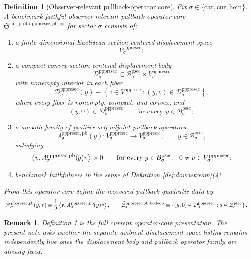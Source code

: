 \documentclass[11pt]{article}
\newcommand{\Car}{\mathrm{car}}
\newcommand{\Cur}{\mathrm{cur}}
\newcommand{\Hom}{\mathrm{hom}}
\newcommand{\ProtoSectionBody}[1]{\mathcal B_{#1}^{\mathrm{psec}}}
\newcommand{\ProtoSectionShell}[1]{\mathcal Z_{#1}^{\mathrm{psec}}}
\newcommand{\PrePreProtoSectionVertical}[1]{V_{#1}^{\mathrm{pppresec}}}
\newcommand{\PrePreProtoSectionResidualBody}[1]{\mathcal D_{#1}^{\mathrm{pppresec}}}
\newcommand{\PrePreProtoSectionPullbackOperator}[1]{A_{#1}^{\mathrm{pppresec,pb}}}
\newcommand{\PrePreProtoSectionPullbackFunctional}[1]{\mathscr P_{#1}^{\mathrm{pppresec,pb}}}
\newcommand{\PullbackOperatorCore}{\mathfrak S^{\mathrm{sub,proto,pppresec,pb,op}}}
\newcommand{\RecoveredPullbackShell}[1]{\widehat{\mathcal Z}_{#1}^{\mathrm{pppresec,pb,bodyop}}}
\newtheorem{definition}{Definition}
\newtheorem{remark}{Remark}
\begin{document}
\begin{definition}[Observer-relevant pullback-operator core]
\label{def:operatorcore}
Fix \(\sigma\in\{\Car,\Cur,\Hom\}\). A \emph{benchmark-faithful observer-relevant pullback-operator core} \(\PullbackOperatorCore\) for sector \(\sigma\) consists of:
\begin{enumerate}
    \item a finite-dimensional Euclidean section-centered displacement space
    \[
    \PrePreProtoSectionVertical{\sigma};
    \]
    \item a compact convex section-centered displacement body
    \[
    \PrePreProtoSectionResidualBody{\sigma}
    \subset
    \ProtoSectionBody{\sigma}\times\PrePreProtoSectionVertical{\sigma}
    \]
    with nonempty interior in each fiber
    \[
    \PrePreProtoSectionResidualBody{\sigma}(y)
    \equiv
    \left\{
    v\in\PrePreProtoSectionVertical{\sigma}:(y,v)\in\PrePreProtoSectionResidualBody{\sigma}
    \right\},
    \]
    where every fiber is nonempty, compact, and convex, and
    \[
    (y,0)\in\PrePreProtoSectionResidualBody{\sigma}
    \qquad
    \text{for every }
    y\in\ProtoSectionBody{\sigma};
    \]
    \item a smooth family of positive self-adjoint pullback operators
    \[
    \PrePreProtoSectionPullbackOperator{\sigma}(y):
    \PrePreProtoSectionVertical{\sigma}\to\PrePreProtoSectionVertical{\sigma},
    \qquad
    y\in\ProtoSectionBody{\sigma},
    \]
    satisfying
    \[
    \ev{v,\PrePreProtoSectionPullbackOperator{\sigma}(y)v}>0
    \qquad
    \text{for every }
    y\in\ProtoSectionBody{\sigma},
    \ \ 0\neq v\in\PrePreProtoSectionVertical{\sigma};
    \]
    \item benchmark faithfulness in the sense of Definition \ref{def:downstream}(4).
\end{enumerate}
From this operator core define the recovered pullback quadratic data by
\[
\PrePreProtoSectionPullbackFunctional{\sigma}(y,v)
\equiv
\frac{1}{2}
\ev{v,\PrePreProtoSectionPullbackOperator{\sigma}(y)v},
\qquad
\RecoveredPullbackShell{\sigma}
\equiv
\left\{
(y,0)\in\PrePreProtoSectionResidualBody{\sigma}:y\in\ProtoSectionShell{\sigma}
\right\}.
\]
\end{definition}

\begin{remark}
Definition \ref{def:operatorcore} is the full current operator-core presentation. The present note asks whether the separate ambient displacement-space listing remains independently live once the displacement body and pullback operator family are already fixed.
\end{remark}
\end{document}
